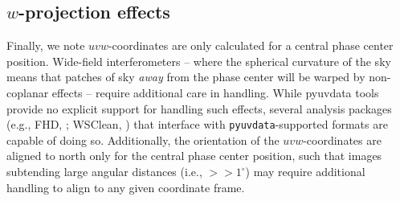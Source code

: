 \documentclass[11pt, oneside]{article}
\begin{document}
\subsection{$w$-projection effects}
Finally, we note $uvw$-coordinates are only calculated for a central phase center position. Wide-field interferometers -- where the spherical curvature of the sky means that patches of sky \emph{away} from the phase center will be warped by non-coplanar effects -- require additional care in handling. While pyuvdata tools provide no explicit support for handling such effects, several analysis packages (e.g., FHD, \citealt{FHD}; WSClean, \citealt{WSClean}) that interface with \texttt{pyuvdata}-supported formats are capable of doing so. Additionally, the orientation of the $uvw$-coordinates are aligned to north only for the central phase center position, such that images subtending large angular distances (i.e., $>>1^{\circ}$) may require additional handling to align to any given coordinate frame.

\appendix
\end{document}
